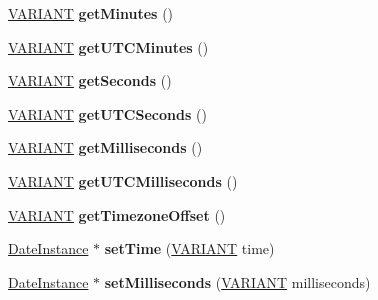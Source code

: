 \begin{DoxyCompactItemize}
\hyperlink{structtag_v_a_r_i_a_n_t}{V\+A\+R\+I\+A\+NT} {\bfseries get\+Minutes} ()
\item 
\mbox{\label{interface_j_s_global_1_1_date_instance_ae6dfd51fab4878c956f1bb1a2fa6fe3c}} 
\hyperlink{structtag_v_a_r_i_a_n_t}{V\+A\+R\+I\+A\+NT} {\bfseries get\+U\+T\+C\+Minutes} ()
\item 
\mbox{\label{interface_j_s_global_1_1_date_instance_a4203250ff1b012947acc292901a4d705}} 
\hyperlink{structtag_v_a_r_i_a_n_t}{V\+A\+R\+I\+A\+NT} {\bfseries get\+Seconds} ()
\item 
\mbox{\label{interface_j_s_global_1_1_date_instance_af80c8ae264955222361927600157c4d8}} 
\hyperlink{structtag_v_a_r_i_a_n_t}{V\+A\+R\+I\+A\+NT} {\bfseries get\+U\+T\+C\+Seconds} ()
\item 
\mbox{\label{interface_j_s_global_1_1_date_instance_a009945d752343658934f7d18d581b8c0}} 
\hyperlink{structtag_v_a_r_i_a_n_t}{V\+A\+R\+I\+A\+NT} {\bfseries get\+Milliseconds} ()
\item 
\mbox{\label{interface_j_s_global_1_1_date_instance_a46b686f100d90874461a4874100546fa}} 
\hyperlink{structtag_v_a_r_i_a_n_t}{V\+A\+R\+I\+A\+NT} {\bfseries get\+U\+T\+C\+Milliseconds} ()
\item 
\mbox{\label{interface_j_s_global_1_1_date_instance_af3e28098fcba1d2bba91e979d89a6b15}} 
\hyperlink{structtag_v_a_r_i_a_n_t}{V\+A\+R\+I\+A\+NT} {\bfseries get\+Timezone\+Offset} ()
\item 
\mbox{\label{interface_j_s_global_1_1_date_instance_a1a077c1691713922a2a9ae365320b7ce}} 
\hyperlink{interface_j_s_global_1_1_date_instance}{Date\+Instance} $\ast$ {\bfseries set\+Time} (\hyperlink{structtag_v_a_r_i_a_n_t}{V\+A\+R\+I\+A\+NT} time)
\item 
\mbox{\label{interface_j_s_global_1_1_date_instance_a9a117da301452d00a9d5c25e71b9c851}} 
\hyperlink{interface_j_s_global_1_1_date_instance}{Date\+Instance} $\ast$ {\bfseries set\+Milliseconds} (\hyperlink{structtag_v_a_r_i_a_n_t}{V\+A\+R\+I\+A\+NT} milliseconds)

\end{DoxyCompactItemize}

